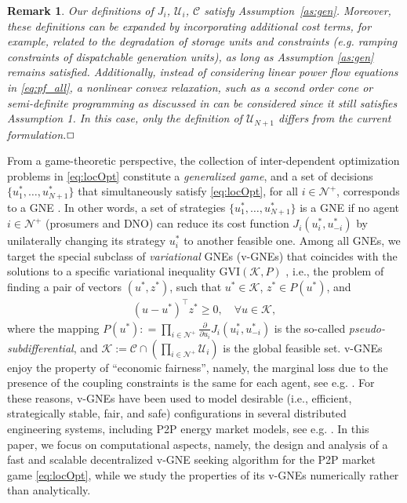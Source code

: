 \documentclass{IEEEtran}  %
\newtheorem{remark}{Remark}
\newcommand{\eod}{\ensuremath{\hfill\Box}}
\newcommand{\mc}{\mathcal}
\newcommand{\0}{\mathbf{0}}
\newcommand{\1}{\mathbf{1}}
\begin{document}
\begin{remark}
Our definitions of $J_i$, $\mc U_i$, $\mc C$ satisfy Assumption~\ref{as:gen}. Moreover, these definitions can be expanded by incorporating additional cost terms, for example, related to the degradation of storage units and constraints (e.g. ramping constraints of dispatchable generation units), as long as Assumption \ref{as:gen} remains satisfied.  {Additionally, instead of considering linear power flow equations in \eqref{eq:pf_all}, a nonlinear convex relaxation, such as a second order cone or semi-definite programming as discussed in \cite[Sect. II-A]{molzahn2017} can be considered since it still satisfies Assumption 1. In this case, only the definition of $\mc U_{N+1}$ differs from the current formulation.}\eod
\end{remark}

From a game-theoretic perspective, the collection of inter-dependent optimization problems in \eqref{eq:locOpt} constitute a \textit{generalized game}, and a set of decisions $\{u_1^*,\ldots,u_{N+1}^*\}$ that simultaneously satisfy \eqref{eq:locOpt}, for all $i \in \mc N^+$, corresponds to a GNE \cite[\S~2]{facchinei201012}.
%
In other words, a set of strategies $\{u_1^*,\ldots,u_{N+1}^*\}$ is a GNE if no agent $i \in \mc N^+$ (prosumers and DNO)  can reduce its cost  function $J_{i}(u_{i}^*, u_{-i}^*)$ by unilaterally changing its strategy $u_i^*$ to another feasible one.
%
%
{Among all GNEs, we target the special subclass of \textit{variational} GNEs (v-GNEs) that coincides with the solutions to a specific variational inequality GVI$(\mc K, P)$ \cite[Prop.~12.4]{facchinei201012},  i.e., the problem of finding a pair of vectors $(u^*,z^*)$, such that $u^* \in \mc K$, $z^* \in P(u^*)$, and
\begin{align*}
{(u - u^*)}^\top z^* \geq 0, \quad \forall u  \in  {\mc K}, 
\end{align*}
where the mapping $P(u^*): = \prod_{i \in \mc N^+} \frac{\partial}{\partial u_i} J_i(u_i^*,u_{-i}^*)$ is the so-called \textit{pseudo-subdifferential}, and $\mc K:= \mc C \cap (\prod_{i \in \mc N^+} \mc U_i)$ is the global feasible set.
%
v-GNEs enjoy the property of ``economic fairness”, namely, the marginal loss due to the presence of the coupling constraints is the same for each agent, see e.g. \cite{kulkarni2012variational}. For these reasons, v-GNEs have been used to model desirable (i.e., efficient, strategically stable, fair, and safe) configurations in several distributed engineering systems, including P2P energy market models, see e.g. \cite{lecadre2020}. In this paper, we focus on computational aspects, namely, the design and analysis of a fast and scalable decentralized v-GNE seeking algorithm for the P2P market game \eqref{eq:locOpt}, while we study the properties of its v-GNEs numerically rather than analytically.} 
\end{document}
